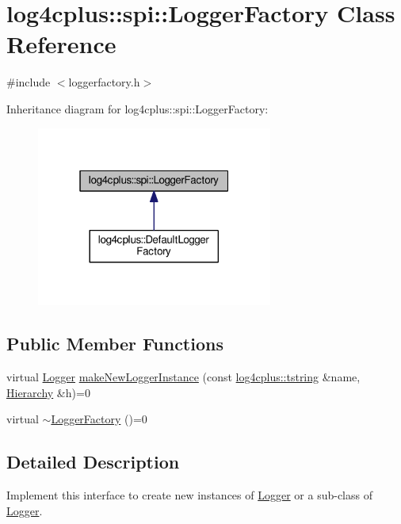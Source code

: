 \hypertarget{classlog4cplus_1_1spi_1_1LoggerFactory}{\section{log4cplus\-:\-:spi\-:\-:Logger\-Factory Class Reference}
\label{classlog4cplus_1_1spi_1_1LoggerFactory}
}


{\ttfamily \#include $<$loggerfactory.\-h$>$}



Inheritance diagram for log4cplus\-:\-:spi\-:\-:Logger\-Factory\-:
\nopagebreak
\begin{figure}[H]
\begin{center}
\leavevmode
\includegraphics[width=220pt]{classlog4cplus_1_1spi_1_1LoggerFactory__inherit__graph}
\end{center}
\end{figure}
\subsection*{Public Member Functions}
\begin{DoxyCompactItemize}
\item 
virtual \hyperlink{classlog4cplus_1_1Logger}{Logger} \hyperlink{classlog4cplus_1_1spi_1_1LoggerFactory_a558090f4c5c94457627a9134b247a49e}{make\-New\-Logger\-Instance} (const \hyperlink{namespacelog4cplus_a3c9287f6ebcddc50355e29d71152117b}{log4cplus\-::tstring} \&name, \hyperlink{classlog4cplus_1_1Hierarchy}{Hierarchy} \&h)=0
\item 
virtual \hyperlink{classlog4cplus_1_1spi_1_1LoggerFactory_a9666147535ed784c933307a83c11a342}{$\sim$\-Logger\-Factory} ()=0
\end{DoxyCompactItemize}


\subsection{Detailed Description}
Implement this interface to create new instances of \hyperlink{classlog4cplus_1_1Logger}{Logger} or a sub-\/class of \hyperlink{classlog4cplus_1_1Logger}{Logger}. 

